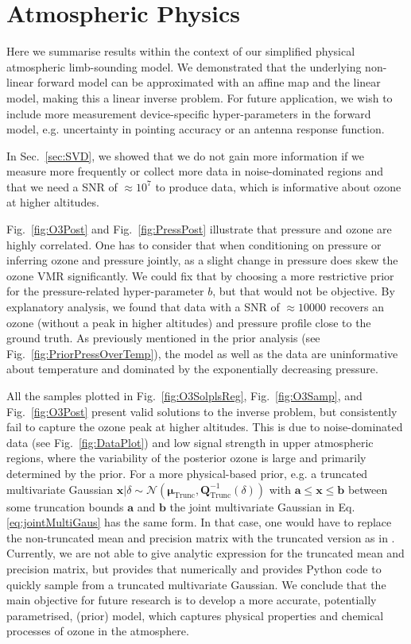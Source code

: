 \section{Atmospheric Physics}
Here we summarise results within the context of our simplified physical atmospheric limb-sounding model.
We demonstrated that the underlying non-linear forward model can be approximated with an affine map and the linear model, making this a linear inverse problem.
For future application, we wish to include more measurement device-specific hyper-parameters in the forward model, e.g. uncertainty in pointing accuracy or an antenna response function.

In Sec.~\ref{sec:SVD}, we showed that we do not gain more information if we measure more frequently or collect more data in noise-dominated regions and that we need a SNR of $\approx10^7$ to produce data, which is informative about ozone at higher altitudes.

Fig.~\ref{fig:O3Post} and Fig.~\ref{fig:PressPost} illustrate that pressure and ozone are highly correlated.
One has to consider that when conditioning on pressure or inferring ozone and pressure jointly, as a slight change in pressure does skew the ozone VMR significantly.
We could fix that by choosing a more restrictive prior for the pressure-related hyper-parameter $b$, but that would not be objective.
By explanatory analysis, we found that data with a SNR of $\approx 10000$ recovers an ozone (without a peak in higher altitudes) and pressure profile close to the ground truth.
As previously mentioned in the prior analysis (see Fig.~\ref{fig:PriorPressOverTemp}), the model as well as the data are uninformative about temperature and dominated by the exponentially decreasing pressure.

All the samples plotted in Fig.~\ref{fig:O3SolplsReg}, Fig.~\ref{fig:O3Samp}, and Fig.~\ref{fig:O3Post} present valid solutions to the inverse problem, but consistently fail to capture the ozone peak at higher altitudes.
This is due to noise-dominated data (see Fig.~\ref{fig:DataPlot}) and low signal strength in upper atmospheric regions, where the variability of the posterior ozone is large and primarily determined by the prior.
For a more physical-based prior, e.g. a truncated multivariate Gaussian $\bm{x} | \delta \sim \mathcal{N}(\bm{\mu}_{\text{Trunc}}, \bm{Q}^{-1}_{\text{Trunc}}(\delta))$ with $\bm{a}\leq \bm{x} \leq \bm{b}$ between some truncation bounds $\bm{a}$ and $\bm{b}$ the joint multivariate Gaussian in Eq. \ref{eq:jointMultiGaus} has the same form.
In that case, one would have to replace the non-truncated mean and precision matrix with the truncated version as in \cite[pp. 204-205]{Kotz2000truncMulti}.
Currently, we are not able to give analytic expression for the truncated mean and precision matrix, but \cite{ManjunathWilhel2021} provides that numerically and \cite{BotevTruncMulti} provides Python code to quickly sample from a truncated multivariate Gaussian.
We conclude that the main objective for future research is to develop a more accurate, potentially parametrised, (prior) model, which captures physical properties and chemical processes of ozone in the atmosphere.




